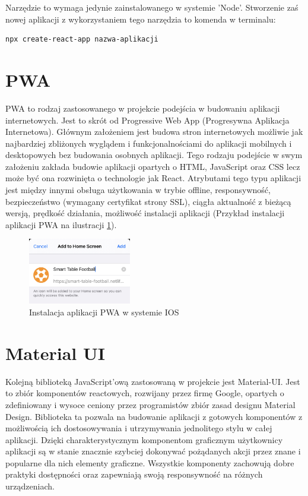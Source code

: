 Narzędzie to wymaga jedynie zainstalowanego w systemie 'Node'. Stworzenie zaś nowej aplikacji z wykorzystaniem tego narzędzia to komenda w terminalu:

\begin{lstlisting}[breaklines=true]
    npx create-react-app nazwa-aplikacji
\end{lstlisting}

\label{ch:frontend:pwa}
\section{PWA}
PWA to rodzaj zastosowanego w projekcie podejścia w budowaniu aplikacji internetowych. Jest to skrót od Progressive Web App (Progresywna Aplikacja Internetowa). Głównym założeniem jest budowa stron internetowych możliwie jak najbardziej zbliżonych wyglądem i funkcjonalnościami do aplikacji mobilnych i desktopowych bez budowania osobnych aplikacji. Tego rodzaju podejście w swym założeniu zakłada budowie aplikacji opartych o HTML, JavaScript oraz CSS lecz może być ona rozwinięta o technologie jak React. Atrybutami tego typu aplikacji jest między innymi obsługa użytkowania w trybie offline, responsywność, bezpieczeństwo (wymagany certyfikat strony SSL), ciągła aktualność z bieżącą wersją, prędkość działania, możliwość instalacji aplikacji (Przykład instalacji aplikacji PWA na ilustracji \ref{fig:pwa-installation}).

\begin{figure}[h!]
    \centering
    \includegraphics[width=0.4\textwidth]{images/player/PWA_install.jpg}
    \caption{Instalacja aplikacji PWA w systemie IOS}
    \label{fig:pwa-installation}
\end{figure}

\label{section:material-ui}
\section{Material UI}
Kolejną biblioteką JavaScript'ową zastosowaną w projekcie jest Material-UI. Jest to zbiór komponentów reactowych, rozwijany przez firmę Google, opartych o zdefiniowany i wysoce ceniony przez programistów zbiór zasad designu Material Design. Biblioteka ta pozwala na budowanie aplikacji z gotowych komponentów z możliwością ich dostosowywania i utrzymywania jednolitego stylu w całej aplikacji. Dzięki charakterystycznym komponentom graficznym użytkownicy aplikacji są w stanie znacznie szybciej dokonywać pożądanych akcji przez znane i popularne dla nich elementy graficzne. Wszystkie komponenty zachowują dobre praktyki dostępności oraz zapewniają swoją responsywność na różnych urządzeniach.

